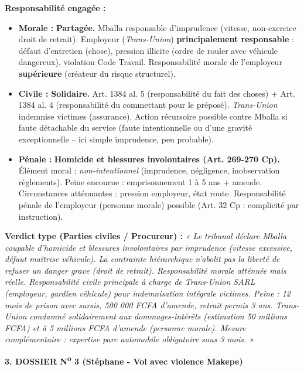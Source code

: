\documentclass[11pt]{article}
\begin{document}
\begin{exoresolu}
\medskip
\noindent\textbf{Responsabilité engagée :}
\begin{itemize}
    \item \textbf{Morale :} \textbf{Partagée.} Mballa responsable d'imprudence (vitesse, non-exercice droit de retrait). Employeur (\textit{Trans-Union}) \textbf{principalement responsable} : défaut d'entretien (chose), pression illicite (ordre de rouler avec véhicule dangereux), violation Code Travail. Responsabilité morale de l'employeur \textbf{supérieure} (créateur du risque structurel).
    \item \textbf{Civile :} \textbf{Solidaire.} Art. 1384 al. 5 (responsabilité du fait des choses) + Art. 1384 al. 4 (responsabilité du commettant pour le préposé). \textit{Trans-Union} indemnise victimes (assurance). Action récursoire possible contre Mballa si faute détachable du service (faute intentionnelle ou d'une gravité exceptionnelle -- ici simple imprudence, peu probable).
    \item \textbf{Pénale :} \textbf{Homicide et blessures involontaires (Art. 269-270 Cp).} Élément moral : \textit{non-intentionnel} (imprudence, négligence, inobservation règlements). Peine encourue : emprisonnement 1 à 5 ans + amende. Circonstances atténuantes : pression employeur, état route. Responsabilité pénale de l'employeur (personne morale) possible (Art. 32 Cp : complicité par instruction).
\end{itemize}

\medskip
\noindent\textbf{Verdict type (Parties civiles / Procureur) :} \textit{« Le tribunal déclare Mballa coupable d'homicide et blessures involontaires par imprudence (vitesse excessive, défaut maîtrise véhicule). La contrainte hiérarchique n'abolit pas la liberté de refuser un danger grave (droit de retrait). Responsabilité morale atténuée mais réelle. Responsabilité civile principale à charge de Trans-Union SARL (employeur, gardien véhicule) pour indemnisation intégrale victimes. Peine : 12 mois de prison avec sursis, 500 000 FCFA d'amende, retrait permis 3 ans. Trans-Union condamné solidairement aux dommages-intérêts (estimation 50 millions FCFA) et à 5 millions FCFA d'amende (personne morale). Mesure complémentaire : expertise parc automobile obligatoire sous 3 mois. »}

\bigskip
\noindent\textbf{3. DOSSIER N\textsuperscript{o} 3 (Stéphane - Vol avec violence Makepe)}


\end{exoresolu}
\end{document}
